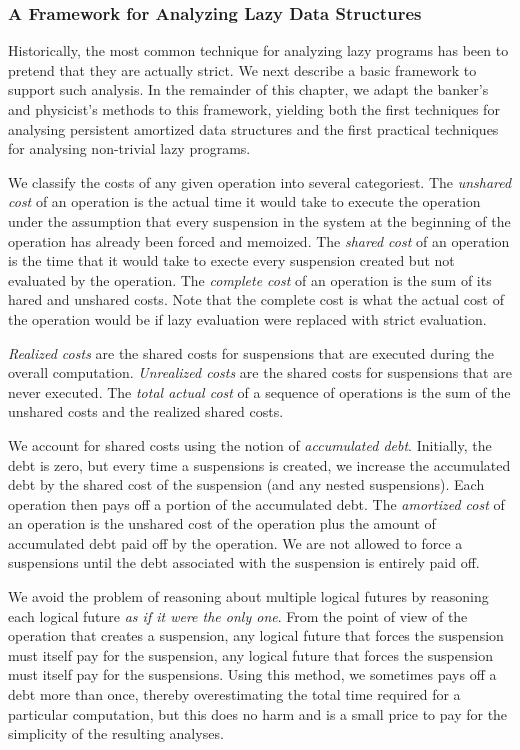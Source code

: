 \documentclass[12pt, a4paper]{article} %
\begin{document}
\subsubsection{A Framework for Analyzing Lazy Data Structures}%
\label{ssub:A Framework for Analyzing Lazy Data Structures}

Historically, the most common technique for analyzing lazy programs has been to pretend that they are actually strict. We next describe a basic framework to support such analysis. In the remainder of this chapter, we adapt the banker's and physicist's methods to this framework, yielding both the first techniques for analysing persistent amortized data structures and the first practical techniques for analysing non-trivial lazy programs.


We classify the costs of any given operation into several categoriest. The \textit{unshared cost} of an operation is the actual time it would take to execute the operation under the assumption that every suspension in the system at the beginning of the operation has already been forced and memoized. The \textit{shared cost} of an operation is the time that it would take to execte every suspension created but not evaluated by the operation. The \textit{complete cost} of an operation is the sum of its hared and unshared costs. Note that the complete cost is what the actual cost of the operation would be if lazy evaluation were replaced with strict evaluation.

\textit{Realized costs} are the shared costs for suspensions that are executed during the overall computation.
\textit{Unrealized costs} are the shared costs for suspensions that are never executed.
The \textit{total actual cost} of a sequence of operations is the sum of the unshared costs and the realized shared costs.

We account for shared costs using the notion of \textit{accumulated debt}. Initially, the debt is zero, but every time a suspensions is created, we increase the accumulated debt by the shared cost of the suspension (and any nested suspensions). Each operation then pays off a portion of the accumulated debt. The \textit{amortized cost} of an operation is the unshared cost of the operation plus the amount of accumulated debt paid off by the operation. We are not allowed to force a suspensions until the debt associated with the suspension is entirely paid off.

We avoid the problem of reasoning about multiple logical futures by reasoning each logical future \textit{as if it were the only one}. From the point of view of the operation that creates a suspension, any logical future that forces the suspension must itself pay for the suspension, any logical future that forces the suspension must itself pay for the suspensions. Using this method, we sometimes pays off a debt more than once, thereby overestimating the total time required for a particular computation, but this does no harm and is a small price to pay for the simplicity of the resulting analyses.
\end{document}
